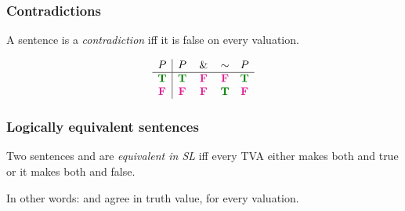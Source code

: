 \begin{frame}
\frametitle{Contradictions}

\begin{definition}
A sentence  is a \emph{contradiction} iff it is false on every
valuation.
\end{definition}

\[\begin{array}{c|cccc}
P & P & \eand & \enot & P \\
\hline
\True & \True & \False & \False & \True\\
\False & \False & \False & \True & \False
\end{array}
\]
\end{frame}

\begin{frame}
\frametitle{Logically equivalent sentences}

\begin{definition}
Two sentences  and  are \emph{equivalent in SL}
iff every TVA either makes both  and  true or
it makes both  and  false.
\end{definition}

In other words:  and  agree in truth value, for
every valuation.


 
 
\end{frame}

